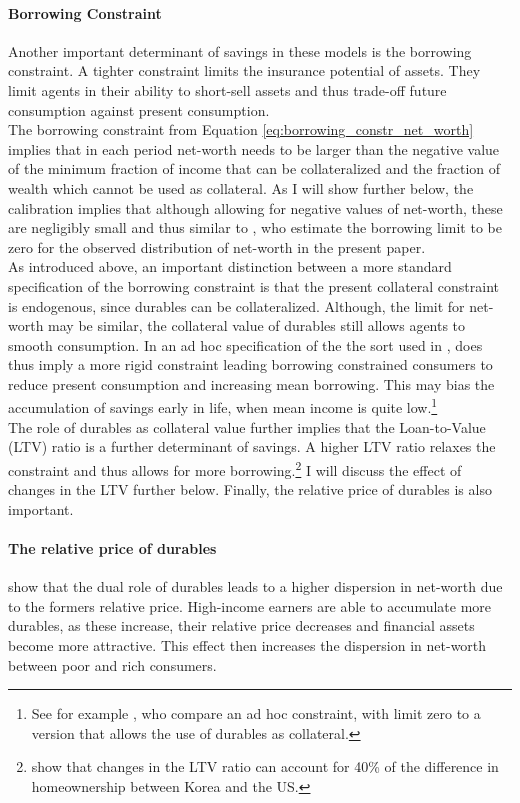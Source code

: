 \documentclass[a4paper,12pt,legno]{article}
\begin{document}
\paragraph{Borrowing Constraint} Another important determinant of savings in these models is the borrowing constraint. A tighter constraint limits the insurance potential of assets. They limit agents in their ability to short-sell assets and thus trade-off future consumption against present consumption. \\ 
The borrowing constraint from Equation \ref{eq:borrowing_constr_net_worth} implies that in each period net-worth needs to be larger than the negative value of the minimum fraction of income that can be collateralized and the fraction of wealth which cannot be used as collateral. As I will show further below, the calibration implies that although allowing for negative values of net-worth, these are negligibly small and thus similar to \cite{hintermaier2011}, who estimate the borrowing limit to be zero for the observed distribution of net-worth in the present paper. 
\\ 
As introduced above, an important distinction between a more standard specification of the borrowing constraint is that the present collateral constraint is endogenous, since durables can be collateralized. Although, the limit for net-worth may be similar, the collateral value of durables still allows agents to smooth consumption. In an ad hoc specification of the the sort used in \cite{hintermaier2011}, does thus imply a more rigid constraint leading borrowing constrained consumers to reduce present consumption and increasing mean borrowing. This may bias the accumulation of savings early in life, when mean income is quite low.\footnote{See for example \cite{FV&K2011}, who compare an ad hoc constraint, with limit zero to a version that allows the use of durables as collateral.} \\ The role of durables as collateral value further implies that the Loan-to-Value (LTV) ratio is a further determinant of savings. A higher LTV ratio relaxes the constraint and thus allows for more borrowing.\footnote{\cite{cho2012accounting} show that changes in the LTV ratio can account for 40\% of the difference in homeownership between Korea and the US.} I will discuss the effect of changes in the LTV further below.
Finally, the relative price of durables is also important.

\paragraph{The relative price of durables} \cite{FV&K2011} show that the dual role of durables leads to a higher dispersion in net-worth due to the formers relative price. High-income earners are able to accumulate more durables, as these increase, their relative price decreases and financial assets become more attractive. This effect then increases the dispersion in net-worth between poor and rich consumers. 
\end{document}
